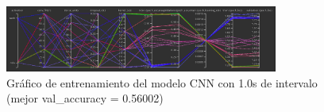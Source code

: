 \begin{figure}[H]
    \centering
    \includegraphics[width=0.8\textwidth]{Imagenes/Bitmap/tb-cnn-1.0.png}
    \caption{Gráfico de entrenamiento del modelo CNN con 1.0s de intervalo (mejor val\_accuracy = 0.56002)}
    \label{fig:cnn-1.0-grafico}
\end{figure}